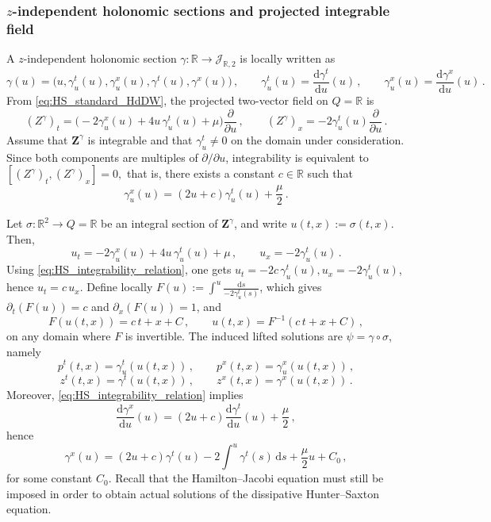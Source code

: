 \documentclass[11pt,twoside]{article}
\theoremstyle{plain}
\theoremstyle{definition}
\theoremstyle{remark}
\newcommand{\dd}{\mathrm{d}}
\renewcommand{\d}{\mathrm{d}}
\begin{document}
\subsubsection{ \texorpdfstring{$z$}{}-independent holonomic sections and projected integrable field}

A $z$-independent holonomic section
\(
\gamma\colon \mathbb R\to \mathcal J_{\mathbb R,2}
\)
is locally written as
\begin{equation}\label{eq:HS_gamma_zind}
\gamma(u)=\bigl(u,\gamma_u^t(u),\gamma_u^x(u),\gamma^t(u),\gamma^x(u)\bigr)\,,
\qquad
\gamma_u^t(u)=\frac{\dd\gamma^t}{\dd u}(u)\,,\qquad
\gamma_u^x(u)=\frac{\dd\gamma^x}{\dd u}(u)\,.
\end{equation}
From \eqref{eq:HS_standard_HdDW}, the projected two-vector field on $Q=\mathbb R$ is
\begin{equation}\label{eq:HS_projected_field}
(Z^\gamma)_t=\bigl(-2\gamma_u^x(u)+4u\,\gamma_u^t(u)+\mu\bigr)\frac{\partial}{\partial u}\,,
\qquad
(Z^\gamma)_x=-2\gamma_u^t(u)\frac{\partial}{\partial u}\,.
\end{equation}
Assume that ${\bm Z}^\gamma$ is integrable and that $\gamma_u^t\neq0$ on the domain under consideration. Since both components are multiples of $\partial/\partial u$, integrability is equivalent to
\(
[(Z^\gamma)_t,(Z^\gamma)_x]=0,
\) 
that is,
there exists a constant $c\in\mathbb R$ such that
\begin{equation}\label{eq:HS_integrability_relation}
\gamma_u^x(u)=(2u+c)\gamma_u^t(u)+\frac{\mu}{2}\,.
\end{equation}

Let $\sigma\colon\mathbb R^2\to Q=\mathbb R$ be an integral section of ${\bm Z}^\gamma$, and write $u(t,x):=\sigma(t,x)$. Then,
\begin{equation}\label{eq:HS_projected_system}
u_t=-2\gamma_u^x(u)+4u\,\gamma_u^t(u)+\mu\,,\qquad
u_x=-2\gamma_u^t(u)\,.
\end{equation}
Using \eqref{eq:HS_integrability_relation}, one gets
\(
u_t=-2c\,\gamma_u^t(u),u_x=-2\gamma_u^t(u)\), hence \( u_t=c\,u_x.
\) 
Define locally
\(
F(u):=\int^u\frac{\d s}{-2\gamma_u^t(s)}
\), which gives $\partial_t(F(u))=c$ and $\partial_x(F(u))=1$, and 
\begin{equation}\label{eq:HS_projected_solution}
F(u(t,x))=c\,t+x+C\,,\qquad
u(t,x)=F^{-1}(c\,t+x+C)\,,
\end{equation}
on any domain where $F$ is invertible. The induced lifted solutions are $\psi=\gamma\circ\sigma$, namely
\[
p^t(t,x)=\gamma_u^t(u(t,x))\,,\qquad p^x(t,x)=\gamma_u^x(u(t,x))\,,
\]
\[
z^t(t,x)=\gamma^t(u(t,x))\,,\qquad z^x(t,x)=\gamma^x(u(t,x))\,.
\]
Moreover, \eqref{eq:HS_integrability_relation} implies
\[
\frac{\dd\gamma^x}{\dd u}(u)=(2u+c)\frac{\dd\gamma^t}{\dd u}(u)+\frac{\mu}{2}\,,
\]
hence
\begin{equation}\label{eq:HS_S_relation}
\gamma^x(u)=(2u+c)\gamma^t(u)-2\int^u \gamma^t(s)\,\d s+\frac{\mu}{2}u+C_0\,,
\end{equation}
for some constant $C_0$. Recall that the Hamilton--Jacobi equation must still be imposed in order to obtain actual solutions of the dissipative Hunter--Saxton equation.
\end{document}
